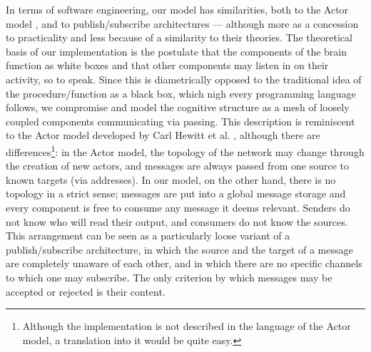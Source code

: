 In terms of software engineering, our model has similarities, both to the Actor model \cite{hewittActor}, and to publish/subscribe architectures \cite{publishSubscribe} --- although more as a concession to practicality and less because of a similarity to their theories. The theoretical basis of our implementation is the postulate that the components of the brain function as white boxes and that other components may listen in on their activity, so to speak. Since this is diametrically opposed to the traditional idea of the procedure/function as a black box, which nigh every programming language follows, we compromise and model the cognitive structure as a mesh of loosely coupled components communicating via passing. This description is reminiscent to the Actor model developed by Carl Hewitt et al. \cite{hewittActor}, although there are differences\footnote{Although the implementation is not described in the language of the Actor model, a translation into it would be quite easy.}: in the Actor model, the topology of the network may change through the creation of new actors, and messages are always passed from one source to known targets (via addresses). In our model, on the other hand, there is no topology in a strict sense; messages are put into a global message storage and every component is free to consume any message it deems relevant. Senders do not know who will read their output, and consumers do not know the sources. This arrangement can be seen as a particularly loose variant of a publish/subscribe architecture, in which the source and the target of a message are completely unaware of each other, and in which there are no specific channels to which one may subscribe. The only criterion by which messages may be accepted or rejected is their content.


